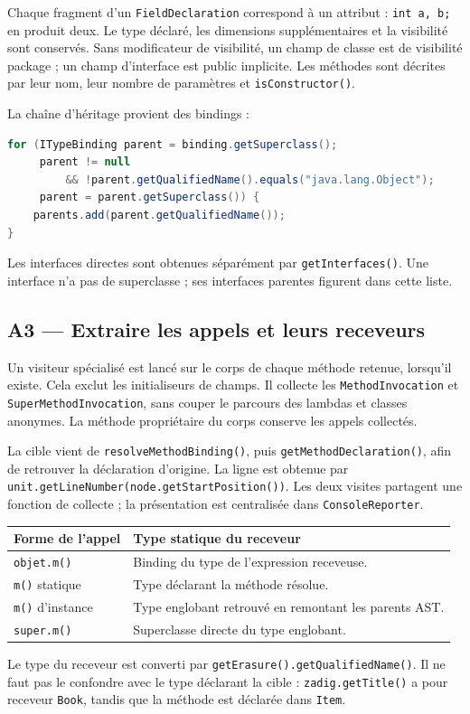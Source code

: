 \documentclass[11pt,a4paper]{article}
\newcommand{\code}[1]{\texttt{#1}}
\begin{document}
Chaque fragment d'un \code{FieldDeclaration} correspond à un attribut : \code{int a, b;} en produit deux. Le type déclaré, les dimensions supplémentaires et la visibilité sont conservés. Sans modificateur de visibilité, un champ de classe est de visibilité package ; un champ d'interface est public implicite. Les méthodes sont décrites par leur nom, leur nombre de paramètres et \code{isConstructor()}.

La chaîne d'héritage provient des bindings :
\begin{lstlisting}[language=Java]
for (ITypeBinding parent = binding.getSuperclass();
     parent != null
         && !parent.getQualifiedName().equals("java.lang.Object");
     parent = parent.getSuperclass()) {
    parents.add(parent.getQualifiedName());
}
\end{lstlisting}
Les interfaces directes sont obtenues séparément par \code{getInterfaces()}. Une interface n'a pas de superclasse ; ses interfaces parentes figurent dans cette liste.

\subsection{A3 --- Extraire les appels et leurs receveurs}
Un visiteur spécialisé est lancé sur le corps de chaque méthode retenue, lorsqu'il existe. Cela exclut les initialiseurs de champs. Il collecte les \code{MethodInvocation} et \code{SuperMethodInvocation}, sans couper le parcours des lambdas et classes anonymes. La méthode propriétaire du corps conserve les appels collectés.

La cible vient de \code{resolveMethodBinding()}, puis \code{getMethodDeclaration()}, afin de retrouver la déclaration d'origine. La ligne est obtenue par \code{unit.getLineNumber(node.getStartPosition())}. Les deux visites partagent une fonction de collecte ; la présentation est centralisée dans \code{ConsoleReporter}.

\begin{center}
\begin{tabularx}{\textwidth}{lX}
\toprule
Forme de l'appel & Type statique du receveur\\
\midrule
\code{objet.m()} & Binding du type de l'expression receveuse.\\
\code{m()} statique & Type déclarant la méthode résolue.\\
\code{m()} d'instance & Type englobant retrouvé en remontant les parents AST.\\
\code{super.m()} & Superclasse directe du type englobant.\\
\bottomrule
\end{tabularx}
\end{center}
Le type du receveur est converti par \code{getErasure().getQualifiedName()}. Il ne faut pas le confondre avec le type déclarant la cible : \code{zadig.getTitle()} a pour receveur \code{Book}, tandis que la méthode est déclarée dans \code{Item}.
\end{document}
